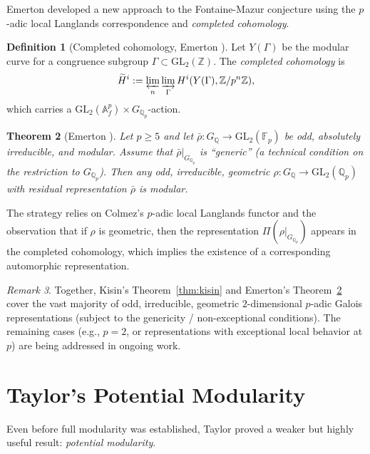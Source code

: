 \documentclass[12pt,a4paper]{amsart}
\newtheorem{theorem}{Theorem}[section]
\theoremstyle{definition}
\newtheorem{definition}[theorem]{Definition}
\theoremstyle{remark}
\newtheorem{remark}[theorem]{Remark}
\newcommand{\GL}{\mathrm{GL}}
\newcommand{\Qp}{\mathbb{Q}_p}
\newcommand{\GQ}{G_{\mathbb{Q}}}
\newcommand{\Z}{\mathbb{Z}}
\newcommand{\F}{\mathbb{F}}
\begin{document}
Emerton \cite{Emerton2010} developed a new approach to the Fontaine-Mazur conjecture
using the $p$-adic local Langlands correspondence and \emph{completed cohomology}.

\begin{definition}[Completed cohomology, Emerton \cite{Emerton2006}]
  Let $Y(\Gamma)$ be the modular curve for a congruence subgroup $\Gamma \subset \GL_2(\Z)$.
  The \emph{completed cohomology} is
  \[
    \widetilde{H}^i := \varprojlim_n \varinjlim_\Gamma H^i(Y(\Gamma), \Z/p^n\Z),
  \]
  which carries a $\GL_2(\mathbb{A}_f^p) \times G_{\Qp}$-action.
\end{definition}

\begin{theorem}[Emerton \cite{Emerton2010}]\label{thm:emerton}
  Let $p \geq 5$ and let $\bar{\rho}\colon \GQ \to \GL_2(\F_p)$ be odd, absolutely
  irreducible, and modular. Assume that $\bar{\rho}|_{G_{\Qp}}$ is ``generic'' (a technical
  condition on the restriction to $G_{\Qp}$). Then any odd, irreducible, geometric
  $\rho\colon \GQ \to \GL_2(\Qp)$ with residual representation $\bar{\rho}$ is modular.
\end{theorem}

The strategy relies on Colmez's $p$-adic local Langlands functor and the observation that
if $\rho$ is geometric, then the representation $\Pi(\rho|_{G_{\Qp}})$ appears in
the completed cohomology, which implies the existence of a corresponding automorphic
representation.

\begin{remark}
  Together, Kisin's Theorem~\ref{thm:kisin} and Emerton's Theorem~\ref{thm:emerton} cover
  the vast majority of odd, irreducible, geometric $2$-dimensional $p$-adic Galois
  representations (subject to the genericity / non-exceptional conditions).
  The remaining cases (e.g., $p=2$, or representations with exceptional local behavior at
  $p$) are being addressed in ongoing work.
\end{remark}

\section{Taylor's Potential Modularity}\label{sec:taylor}

Even before full modularity was established, Taylor \cite{Taylor2002,Taylor2004}
proved a weaker but highly useful result: \emph{potential modularity}.
\end{document}
